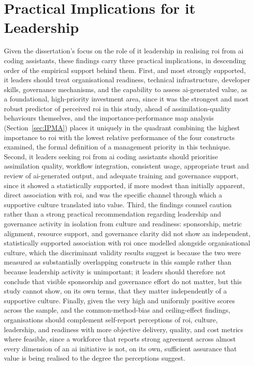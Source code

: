 \section{Practical Implications for \gls{it} Leadership}
\label{sec:Practical Implications for IT Leadership}
Given the dissertation's focus on the role of \gls{it} leadership in realising \gls{roi} from \gls{ai} coding assistants, these findings carry three practical implications, in descending order of the empirical support behind them. First, and most strongly supported, \gls{it} leaders should treat organisational readiness, technical infrastructure, developer skills, governance mechanisms, and the capability to assess \gls{ai}-generated value, as a foundational, high-priority investment area, since it was the strongest and most robust predictor of perceived \gls{roi} in this study, ahead of assimilation-quality behaviours themselves, and the importance-performance map analysis (Section~\ref{sec:IPMA}) places it uniquely in the quadrant combining the highest importance to \gls{roi} with the lowest relative performance of the four constructs examined, the formal definition of a management priority in this technique. Second, \gls{it} leaders seeking \gls{roi} from \gls{ai} coding assistants should prioritise assimilation quality, workflow integration, consistent usage, appropriate trust and review of \gls{ai}-generated output, and adequate training and governance support, since it showed a statistically supported, if more modest than initially apparent, direct association with \gls{roi}, and was the specific channel through which a supportive culture translated into value. Third, the findings counsel caution rather than a strong practical recommendation regarding leadership and governance activity in isolation from culture and readiness: sponsorship, metric alignment, resource support, and governance clarity did not show an independent, statistically supported association with \gls{roi} once modelled alongside organisational culture, which the discriminant validity results suggest is because the two were measured as substantially overlapping constructs in this sample rather than because leadership activity is unimportant; \gls{it} leaders should therefore not conclude that visible sponsorship and governance effort do not matter, but this study cannot show, on its own terms, that they matter independently of a supportive culture. Finally, given the very high and uniformly positive scores across the sample, and the common-method-bias and ceiling-effect findings, organisations should complement self-report perceptions of \gls{roi}, culture, leadership, and readiness with more objective delivery, quality, and cost metrics where feasible, since a workforce that reports strong agreement across almost every dimension of an \gls{ai} initiative is not, on its own, sufficient assurance that value is being realised to the degree the perceptions suggest.

